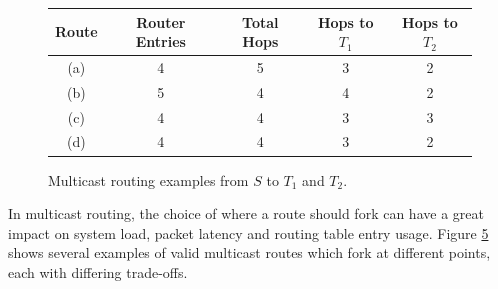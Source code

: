 				\begin{figure}[t!]
					\begin{subfigure}[b]{0.24\textwidth}
						\center
						
						\caption{}
						\label{fig:multicast-routing-a}
					\end{subfigure}
					\begin{subfigure}[b]{0.24\textwidth}
						\center
						
						\caption{}
						\label{fig:multicast-routing-b}
					\end{subfigure}
					\begin{subfigure}[b]{0.24\textwidth}
						\center
						
						\caption{}
						\label{fig:multicast-routing-c}
					\end{subfigure}
					\begin{subfigure}[b]{0.24\textwidth}
						\center
						
						\caption{}
						\label{fig:multicast-routing-d}
					\end{subfigure}
					
					\center
					\begin{tabular}{c c c c c}
						\toprule
							Route & Router Entries & Total Hops & Hops to $T_1$ & Hops to $T_2$ \\
						\midrule
							(a)   & 4              & 5          & 3             & 2             \\
							(b)   & 5              & 4          & 4             & 2             \\
							(c)   & 4              & 4          & 3             & 3             \\
							(d)   & 4              & 4          & 3             & 2             \\
						\bottomrule
					\end{tabular}
					
					\caption[Multicast routing examples.]{Multicast routing examples from
					$S$ to $T_1$ and $T_2$.}
					\label{fig:multicast-routing}
				\end{figure}
				
				In multicast routing, the choice of where a route should fork can have a
				great impact on system load, packet latency and routing table entry
				usage. Figure \ref{fig:multicast-routing} shows several examples of
				valid multicast routes which fork at different points, each with
				differing trade-offs.
				
				
